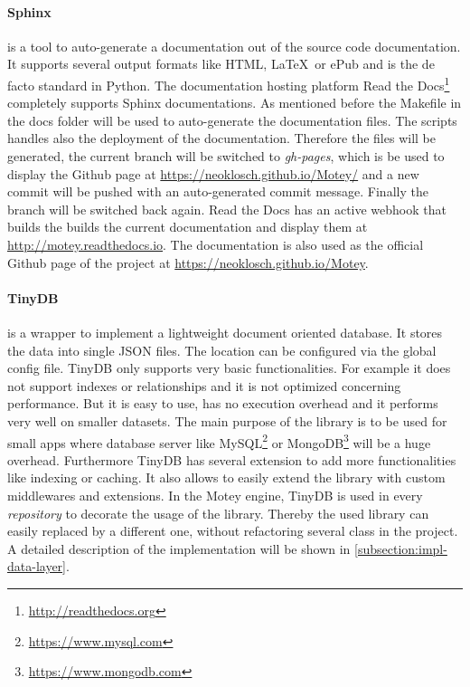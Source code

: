 \paragraph{Sphinx} is a tool to auto-generate a documentation out of the source code documentation.
It supports several output formats like \ac{HTML}, \LaTeX\ or ePub and is the de facto standard in Python.
The documentation hosting platform Read the Docs\footnote{\url{http://readthedocs.org}} completely supports Sphinx documentations.
As mentioned before the Makefile in the docs folder will be used to auto-generate the documentation files.
The scripts handles also the deployment of the documentation.
Therefore the files will be generated, the current branch will be switched to \textit{gh-pages}, which is be used to display the Github page at \url{https://neoklosch.github.io/Motey/} and a new commit will be pushed with an auto-generated commit message.
Finally the branch will be switched back again.
Read the Docs has an active webhook that builds the builds the current documentation and display them at \url{http://motey.readthedocs.io}.
The documentation is also used as the official Github page of the project at \url{https://neoklosch.github.io/Motey}.

\paragraph{TinyDB} is a wrapper to implement a lightweight document oriented database.
It stores the data into single \ac{JSON} files.
The location can be configured via the global config file.
TinyDB only supports very basic functionalities.
For example it does not support indexes or relationships and it is not optimized concerning performance.
But it is easy to use, has no execution overhead and it performs very well on smaller datasets.
The main purpose of the library is to be used for small apps where database server like MySQL\footnote{\url{https://www.mysql.com}} or MongoDB\footnote{\url{https://www.mongodb.com}} will be a huge overhead.
Furthermore TinyDB has several extension to add more functionalities like indexing or caching.
It also allows to easily extend the library with custom middlewares and extensions.
In the Motey engine, TinyDB is used in every \textit{repository} to decorate the usage of the library.
Thereby the used library can easily replaced by a different one, without refactoring several class in the project.
A detailed description of the implementation will be shown in \ref{subsection:impl-data-layer}.

